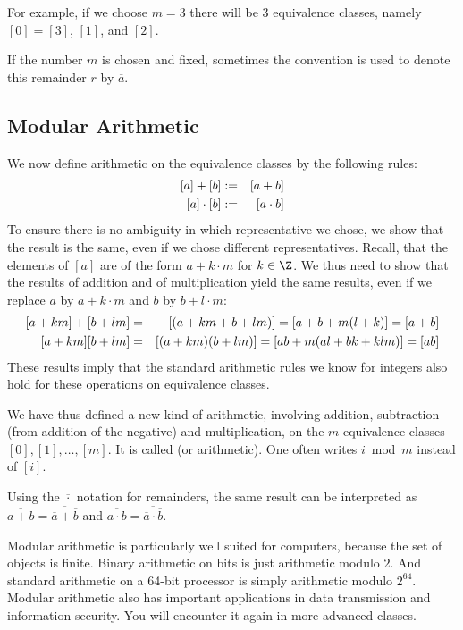 For example, if we choose $m=3$ there will be $3$ equivalence classes,
namely $[0]=[3]$, $[1]$, and $[2]$.

If the number $m$ is chosen and fixed, sometimes the convention is used to
denote this remainder $r$ by $\overline a$.

\subsection{Modular Arithmetic}

We now define arithmetic on the equivalence classes by the following rules:
\begin{eqnarray*}
\hbox{$[a]+[b]$}&:=&[a+b]\\
\hbox{$[a]\cdot[b]$}&:=&[a\cdot b]\\
\end{eqnarray*}
To ensure there is no ambiguity in which representative we chose, we show that the
result is the same, even if we chose different representatives. Recall, that the
elements of $[a]$ are of the form $a+k\cdot m$ for $k\in\Z$. We thus need to show that
the results of addition and of multiplication yield the same results, even if we replace
$a$ by $a+k\cdot m$ and $b$ by $b+l\cdot m$:
\begin{eqnarray*}
\hbox{$[a+km]+[b+lm]$}&=&[(a+km+b+lm)]=[a+b+m(l+k)]=[a+b]\\
\hbox{$[a+km][b+lm]$}&=&[(a+km)(b+lm)]=[ab+m(al+bk+klm)]=[ab]
\end{eqnarray*}
These results imply that the standard arithmetic rules
we know for integers also hold for these operations on equivalence classes.

We have thus defined a new kind of arithmetic, involving addition, subtraction (from
addition of the negative) and multiplication, on the $m$ equivalence classes
$[0],[1],\ldots,[m]$. It is called  (or 
arithmetic). One often writes
$i\bmod m$ instead of $[i]$.

Using the $\overline\cdot$ notation for remainders, the same result can be
interpreted as
$\overline{a+b}=\overline{\overline{a}+\overline{b}}$ and
$\overline{a\cdot b}=\overline{\overline{a}\cdot \overline{b}}$.
\medskip

Modular arithmetic is particularly well suited for computers, because the set
of objects is finite. Binary arithmetic on bits is just arithmetic modulo
$2$. And standard arithmetic on a 64-bit processor is simply arithmetic
modulo $2^{64}$.  Modular arithmetic also has important applications in data
transmission and information security. You will encounter it again in more
advanced classes.

